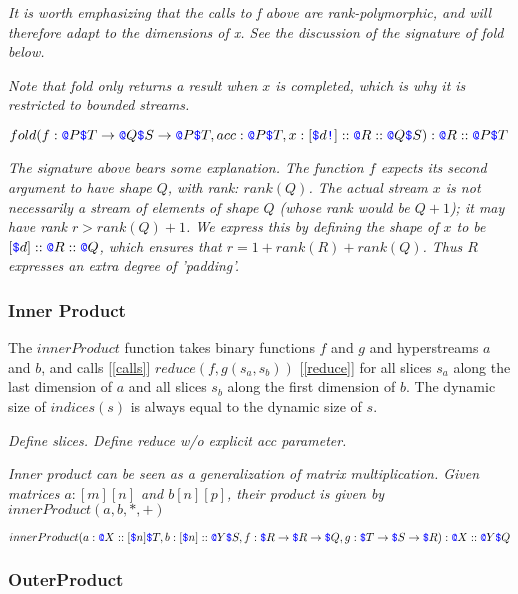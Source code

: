 \documentclass{article}
\begin{document}
{\em It is worth emphasizing that the calls to f above are rank-polymorphic, and will therefore adapt to the dimensions of x. See the discussion of the signature of fold below.
}

{\em Note that fold only returns a result when $x$ is completed, which is why it is restricted to bounded streams.}

$fold(f: \texttt{\color{blue} @}{}P\texttt{\color{blue} \$}{}T \to{}\texttt{\color{blue} @}{}Q\texttt{\color{blue} \$}{}S \to{}\texttt{\color{blue} @}{}P\texttt{\color{blue} \$}{}T, acc: \texttt{\color{blue} @}{}P\texttt{\color{blue} \$}{}T, x:[\texttt{\color{blue} \$}{}d\texttt{\color{blue} !}]::\texttt{\color{blue} @}{}R::\texttt{\color{blue} @}{}Q \texttt{\color{blue} \$}{}S): \texttt{\color{blue} @}{}R::\texttt{\color{blue} @}{}P \texttt{\color{blue} \$}{}T $

{\em
The signature above bears some explanation. The function $f$ expects its second argument to have shape $Q$, with rank: $rank(Q)$. The actual stream $x$ is not necessarily a stream of elements of shape $Q$ (whose rank would be $Q+1$); it may have rank $r \gt rank(Q) + 1$. We express this by defining the shape of $x$ to be $[\texttt{\color{blue} \$}{}d]::\texttt{\color{blue} @}{}R::\texttt{\color{blue} @}{}Q$, which ensures that $r = 1 + rank(R) + rank(Q)$. Thus $R$ expresses an extra degree of 'padding'.
}

\subsubsection{Inner Product}
\label{innerProduct}

The $innerProduct$ function takes binary functions $f$ and $g$ and hyperstreams $a$ and $b$, and calls [\ref{calls}] $reduce(f, g(s_a, s_b))$ [\ref{reduce}] for all slices $s_a$ along the last dimension of  $a$ and all slices  $s_b$ along the first dimension of $b$. The dynamic size  of $indices(s)$ is  always equal to the dynamic size of $s$.


{\em Define slices. Define reduce w/o explicit acc parameter.}

{\em Inner product can be seen as a generalization of matrix multiplication.  Given matrices $a: [m][n]$ and $b[n][p]$, their product is given by
 $innerProduct(a, b, *, +)$

}

$innerProduct(a: \texttt{\color{blue} @}{}X:: [\texttt{\color{blue} \$}{}n]\texttt{\color{blue} \$}{}T, b: [\texttt{\color{blue} \$}{}n]::\texttt{\color{blue} @}{}Y\texttt{\color{blue} \$}{}S,  f: \texttt{\color{blue} \$}{}R \to \texttt{\color{blue} \$}{}R \to \texttt{\color{blue} \$}{}Q, g: \texttt{\color{blue} \$}{}T \to \texttt{\color{blue} \$}{}S \to \texttt{\color{blue} \$}{}R): \texttt{\color{blue} @}{}X::\texttt{\color{blue} @}{}Y\texttt{\color{blue} \$}{}Q$

\subsubsection{OuterProduct}
\label{outerProduct}
\end{document}
